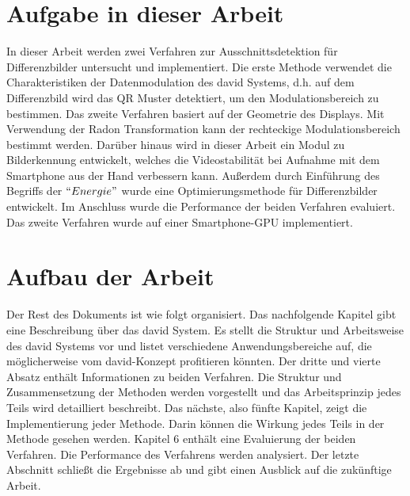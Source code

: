 \section{Aufgabe in dieser Arbeit} 

In dieser Arbeit werden zwei Verfahren zur Ausschnittsdetektion für Differenzbilder untersucht und implementiert. Die erste Methode verwendet die Charakteristiken der Datenmodulation des \gls{david} Systems, d.h. auf dem Differenzbild wird das QR Muster detektiert, um den Modulationsbereich zu bestimmen. Das zweite Verfahren basiert auf der Geometrie des Displays. Mit Verwendung der Radon Transformation kann der rechteckige Modulationsbereich bestimmt werden. Darüber hinaus wird in dieser Arbeit ein Modul zu Bilderkennung entwickelt, welches die Videostabilität bei Aufnahme mit dem Smartphone aus der Hand verbessern kann. Außerdem durch Einführung des Begriffs der $ ``Energie" $ wurde eine Optimierungsmethode für Differenzbilder entwickelt. Im Anschluss wurde die Performance der beiden Verfahren evaluiert. Das zweite Verfahren wurde auf einer Smartphone-GPU implementiert.

\section{Aufbau der Arbeit} 

Der Rest des Dokuments ist wie folgt organisiert. Das nachfolgende Kapitel gibt eine Beschreibung über das \gls{david} System. Es stellt die Struktur und Arbeitsweise des \gls{david} Systems vor und listet verschiedene Anwendungsbereiche auf, die möglicherweise vom \gls{david}-Konzept profitieren könnten. Der dritte und vierte Absatz enthält Informationen zu beiden Verfahren. Die Struktur und Zusammensetzung der Methoden werden vorgestellt und das Arbeitsprinzip jedes Teils wird detailliert beschreibt. Das nächste, also fünfte Kapitel, zeigt die Implementierung jeder Methode. Darin können die Wirkung jedes Teils in der Methode gesehen werden. %
Kapitel 6 enthält eine Evaluierung der beiden Verfahren. Die Performance des Verfahrens werden analysiert. Der letzte Abschnitt schließt die Ergebnisse ab und gibt einen Ausblick auf die zukünftige Arbeit.